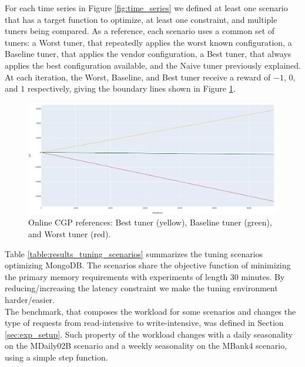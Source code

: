 \documentclass[a4paper, 12pt]{article} %
\begin{document}
	For each time series in Figure \ref{fig:time_series} we defined at least one scenario that has a target function to optimize, at least one constraint, and multiple tuners being compared. As a reference, each scenario uses a common set of tuners: a Worst tuner, that repeatedly applies the worst known configuration, a Baseline tuner, that applies the vendor configuration, a Best tuner, that always applies the best configuration available, and the Naive tuner previously explained.\\
	At each iteration, the Worst, Baseline, and Best tuner receive a reward of $-1$, $0$, and $1$ respectively, giving the boundary lines shown in Figure \ref{fig:results_onlinecgp_references}.
	
	\begin{figure} \centering
		\includegraphics[width=4.5in]{img/results_onlinecgp_references.png}
		\caption{Online CGP references: Best tuner (yellow), Baseline tuner (green), and Worst tuner (red).}
		\label{fig:results_onlinecgp_references}
	\end{figure}
	
	
	Table \ref{table:results_tuning_scenarios} summarizes the tuning scenarios optimizing MongoDB. The scenarios share the objective function of minimizing the primary memory requirements with experiments of length 30 minutes. By reducing/increasing the latency constraint we make the tuning environment harder/easier. \\
	The benchmark, that composes the workload for some scenarios and changes the type of requests from read-intensive to write-intensive, was defined in Section \ref{sec:exp_setup}.
	Such property of the workload changes with a daily seasonality on the MDaily02B scenario and a weekly seasonality on the MBank4 scenario, using a simple step function. 
\end{document}

